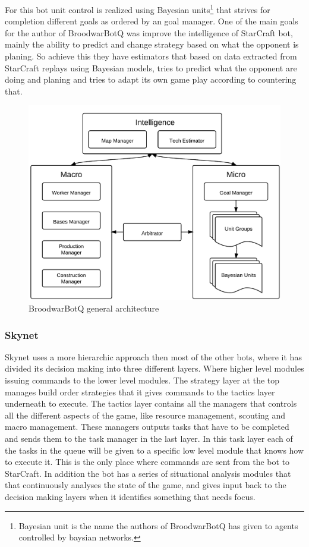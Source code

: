 For this bot unit control is realized using Bayesian units\footnote{Bayesian
unit is the name the authors of BroodwarBotQ has given to agents controlled by
baysian networks.} that strives for completion different goals as ordered by
an goal manager.\cite{synnaeve2011bayesian} One of the main goals for the author
of BroodwarBotQ was improve the intelligence of StarCraft bot, mainly the
ability to predict and change strategy based on what the opponent is planing. So
achieve this they have estimators that based on data extracted from StarCraft
replays using Bayesian models, tries to predict what the opponent are doing and
planing and tries to adapt its own game play according to countering that. 


\begin{figure}[h!tbp]
\centering
\includegraphics[scale=0.8]{graphics/bbq.png}
\caption{BroodwarBotQ general architecture}
\label{fig:bbqarch}
\end{figure}

\subsubsection{Skynet}
Skynet uses a more hierarchic approach then most of the other bots, where it has
divided its decision making into three different layers. Where higher level
modules issuing commands to the lower level modules. The strategy layer at the
top manages build order strategies that it gives commands to the tactics layer
underneath to execute. The tactics layer contains all the managers that controls
all the different aspects of the game, like resource management, scouting and
macro management. These managers outputs tasks that have to be completed and
sends them to the task manager in the last layer. In this task layer each of the
tasks in the queue will be given to a specific low level module that knows how
to execute it. This is the only place where commands are sent from the bot to
StarCraft. In addition the bot has a series of situational analysis modules that
that continuously analyses the state of the game, and gives input back to the
decision making layers when it identifies something that needs focus.

